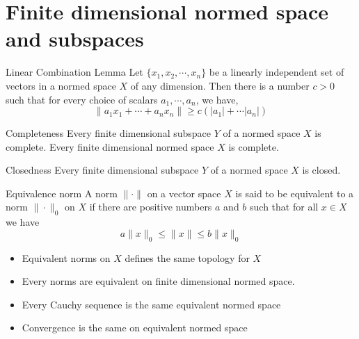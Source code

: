 \section{Finite dimensional normed space and subspaces}

\begin{frame}{Linear Combination Lemma}
Let $\{x_1, x_2,\cdots,x_n\}$ be a linearly independent set of vectors in a normed space $X$ of any dimension. Then there is a number $c>0$ such that for every choice of scalars $a_1,\cdots, a_n$, we have,
$$
\|a_1x_1+\cdots +a_nx_n\|\ge c(|a_1|+\cdots|a_n|)
$$
    
\end{frame}

\begin{frame}{Completeness}
Every finite dimensional subspace $Y$ of a normed space $X$ is complete. Every finite dimensional normed space $X$ is complete.
\end{frame}

\begin{frame}{Closedness}
Every finite dimensional subspace $Y$ of a normed space $X$ is closed.
    
\end{frame}

\begin{frame}{Equivalence norm}
A norm $\|\cdot\|$ on a vector space $X$ is said to be equivalent to a norm $\|\cdot\|_0$ on $X$ if there are positive numbers $a$ and $b$ such that for all $x\in X$ we have
$$
a\|x\|_0\le \|x\|\le b\|x\|_0
$$

\begin{itemize}
    \item Equivalent norms on $X$ defines the same topology for $X$
    \item Every norms are equivalent on finite dimensional normed space.
    \item Every Cauchy sequence is the same equivalent normed space
    \item Convergence is the same on equivalent normed space 
\end{itemize}
    
\end{frame}